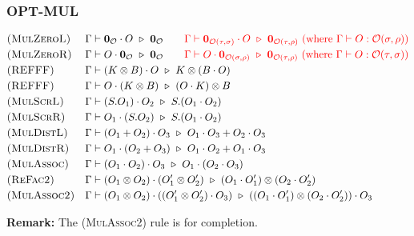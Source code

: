 \subsubsection*{\textsf{OPT-MUL}}
\begin{align*}
  & \textsc{(MulZeroL)} &&
  \Gamma \vdash \mathbf{0}_\mathcal{O} \cdot O \ \triangleright\  \mathbf{0}_\mathcal{O}
  \qquad
  \textcolor{red}{\Gamma \vdash \mathbf{0}_{\mathcal{O}(\tau, \sigma)} \cdot O \ \triangleright\  \mathbf{0}_{\mathcal{O}(\tau, \rho)}\ \textrm{(where $\Gamma \vdash O : \mathcal{O}(\sigma, \rho)$)}} \\
  & \textsc{(MulZeroR)} && 
  \Gamma \vdash O \cdot \mathbf{0}_\mathcal{O} \ \triangleright\  \mathbf{0}_\mathcal{O}
  \qquad
  \textcolor{red}{\Gamma \vdash O \cdot \mathbf{0}_{\mathcal{O}(\sigma, \rho)} \ \triangleright\  \mathbf{0}_{\mathcal{O}(\tau, \rho)}\ \textrm{(where $\Gamma \vdash O : \mathcal{O}(\tau, \sigma)$)}} \\
  & \textsc{(REFFF)} && \Gamma \vdash (K \otimes B) \cdot O \ \triangleright\  K \otimes (B \cdot O)\\
  & \textsc{(REFFF)} && \Gamma \vdash O \cdot (K \otimes B) \ \triangleright\  (O \cdot K) \otimes B\\
  & \textsc{(MulScrL)} && \Gamma \vdash (S.O_1) \cdot O_2 \ \triangleright\  S.(O_1 \cdot O_2) \\
  & \textsc{(MulScrR)} && \Gamma \vdash O_1 \cdot (S.O_2) \ \triangleright\  S.(O_1 \cdot O_2) \\
  & \textsc{(MulDistL)} && \Gamma \vdash (O_1 + O_2) \cdot O_3 \ \triangleright\  O_1 \cdot O_3 + O_2 \cdot O_3 \\
  & \textsc{(MulDistR)} && \Gamma \vdash O_1 \cdot (O_2 + O_3) \ \triangleright\  O_1 \cdot O_2 + O_1 \cdot O_3 \\
  & \textsc{(MulAssoc)} && \Gamma \vdash (O_1 \cdot O_2) \cdot O_3 \ \triangleright\  O_1 \cdot (O_2 \cdot O_3) \\
  & \textsc{(ReFac2)} && \Gamma \vdash (O_1 \otimes O_2) \cdot (O_1' \otimes O_2') \ \triangleright\  (O_1 \cdot O_1') \otimes (O_2 \cdot O_2') \\
  & \textsc{(MulAssoc2)} && \Gamma \vdash (O_1 \otimes O_2) \cdot ((O_1' \otimes O_2') \cdot O_3) \ \triangleright\  ((O_1 \cdot O_1') \otimes (O_2 \cdot O_2')) \cdot O_3 \\
\end{align*}

\textbf{Remark:} The \textsc{(MulAssoc2)} rule is for completion.


